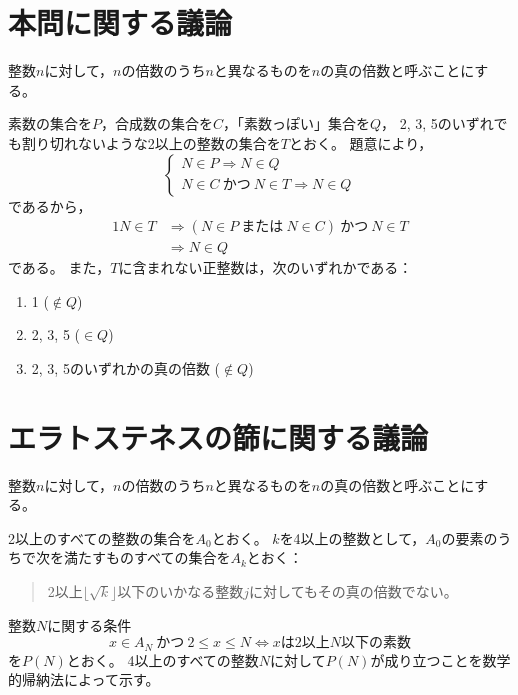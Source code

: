 \documentclass{article}
\begin{document}
\section{本問に関する議論}

整数$n$に対して，$n$の倍数のうち$n$と異なるものを$n$の真の倍数と呼ぶことにする。

素数の集合を$P$，合成数の集合を$C$，「素数っぽい」集合を$Q$，
2, 3, 5のいずれでも割り切れないような2以上の整数の集合を$T$とおく。
題意により，
\begin{equation}
    \begin{cases}
        N \in P \Longrightarrow N \in Q \\
        N \in C\ \mbox{かつ}\ N \in T \Longrightarrow N \in Q
    \end{cases}
\end{equation}
であるから，
\begin{alignat}{1}
    N \in T &\Longrightarrow (N \in P\ \mbox{または}\ N \in C)\ \mbox{かつ}\ N \in T \\
    &\Longrightarrow N \in Q
\end{alignat}
である。
また，$T$に含まれない正整数は，次のいずれかである：
\begin{enumerate}
    \renewcommand{\labelenumi}{\roman{enumi}).}
    \item 1 ($\notin Q$)
    \item 2, 3, 5 ($\in Q$)
    \item 2, 3, 5のいずれかの真の倍数 ($\notin Q$)
\end{enumerate}

\section{エラトステネスの篩に関する議論}

整数$n$に対して，$n$の倍数のうち$n$と異なるものを$n$の真の倍数と呼ぶことにする。

2以上のすべての整数の集合を$A_0$とおく。
$k$を4以上の整数として，$A_0$の要素のうちで次を満たすものすべての集合を$A_k$とおく：
\begin{quote}
    2以上$\lfloor \sqrt{k} \rfloor$以下のいかなる整数$j$に対してもその真の倍数でない。
\end{quote}

整数$N$に関する条件
\begin{equation}
    x \in A_N\ \mbox{かつ}\ 2 \leq x \leq N
    \Longleftrightarrow
    \mbox{$x$は2以上$N$以下の素数}
\end{equation}
を$P(N)$とおく。
4以上のすべての整数$N$に対して$P(N)$が成り立つことを数学的帰納法によって示す。
\end{document}
